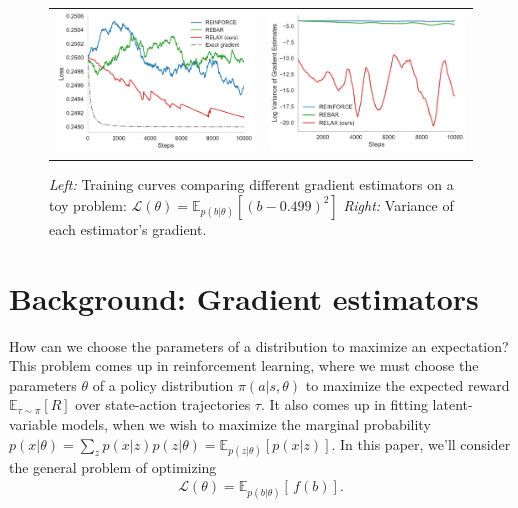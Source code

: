 \documentclass{article}
\newcommand{\discreteDist}{p(b|\theta)}
\newcommand{\loss}{f(b)}
\newcommand{\expectedLoss}{\mathbb{E}_{\discreteDist{}} \! \left[ \, \loss{} \right]}
\newcommand{\E}{\mathbb{E}}
\begin{document}
\begin{figure}[h]
\hspace{-1em}
\centering
\begin{tabular}{c c}
\includegraphics[width=.48\textwidth]{figures/toy_losses_10000_0_499}
&
\includegraphics[width=.48\textwidth]{figures/variance_100_t_499}
\end{tabular}
\vspace{-1em}
\caption{
\emph{Left:} Training curves comparing different gradient estimators on a toy problem: ${\mathcal{L}(\theta) = \E_{p(b|\theta)} [ (b - 0.499)^2 ]}$
\emph{Right:} Variance of each estimator's gradient.
}
\label{first figure}
\end{figure}


\section{Background: Gradient estimators}
How can we choose the parameters of a distribution to maximize an expectation?
This problem comes up in reinforcement learning, where we must choose the parameters $\theta$ of a policy distribution $\pi(a|s, \theta)$ to maximize the expected reward $\mathbb{E}_{\tau \sim \pi} \left[ R \right]$ over state-action trajectories $\tau$.
It also comes up in fitting latent-variable models, when we wish to maximize the marginal probability ${p(x|\theta) = \sum_z p(x|z) p(z|\theta) = \mathbb{E}_{p(z|\theta)} \left[ p(x|z) \right]}$.
In this paper, we'll consider the general problem of optimizing
%
\begin{align}
\mathcal{L}(\theta)=\expectedLoss{}.
\end{align}
\end{document}
